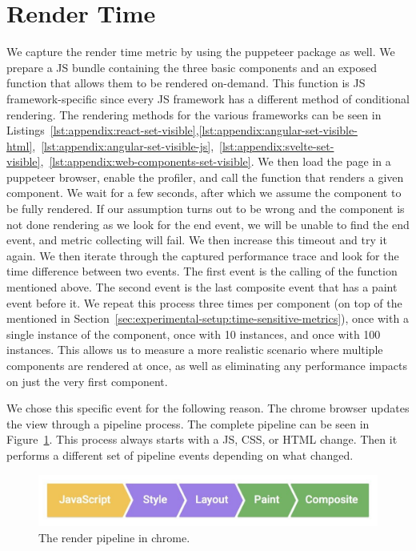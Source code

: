\section{Render Time}
We capture the render time metric by using the puppeteer package as well. We prepare a JS bundle containing the three basic components and an exposed function that allows them to be rendered on-demand. This function is JS framework-specific since every JS framework has a different method of conditional rendering. The rendering methods for the various frameworks can be seen in Listings~\ref{lst:appendix:react-set-visible},\ref{lst:appendix:angular-set-visible-html},~\ref{lst:appendix:angular-set-visible-js},~\ref{lst:appendix:svelte-set-visible},~\ref{lst:appendix:web-components-set-visible}. We then load the page in a puppeteer browser, enable the profiler, and call the function that renders a given component. We wait for a few seconds, after which we assume the component to be fully rendered. If our assumption turns out to be wrong and the component is not done rendering as we look for the end event, we will be unable to find the end event, and metric collecting will fail. We then increase this timeout and try it again. We then iterate through the captured performance trace and look for the time difference between two events. The first event is the calling of the function mentioned above. The second event is the last composite event that has a paint event before it. We repeat this process three times per component (on top of the \numMeasures{} mentioned in Section~\ref{sec:experimental-setup:time-sensitive-metrics}), once with a single instance of the component, once with 10 instances, and once with 100 instances. This allows us to measure a more realistic scenario where multiple components are rendered at once, as well as eliminating any performance impacts on just the very first component.

We chose this specific event for the following reason. The chrome browser updates the view through a pipeline process. The complete pipeline can be seen in Figure~\ref{fig:experimental-setup:pipeline}. This process always starts with a JS, CSS, or HTML change. Then it performs a different set of pipeline events depending on what changed.

\begin{figure}[h]
  \includegraphics[width=\columnwidth]{figures/experimental-setup/render-pipeline.jpg}
  \caption{The render pipeline in chrome.}
  \label{fig:experimental-setup:pipeline}
  \centering
\end{figure}


